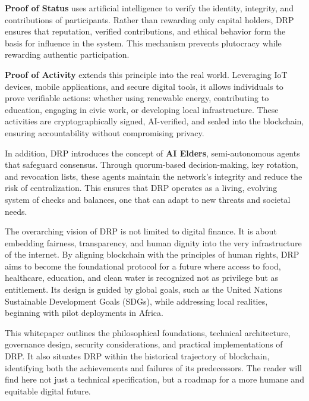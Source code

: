 \documentclass[11pt,a4paper]{article}
\begin{document}
\textbf{Proof of Status} uses artificial intelligence to verify the identity, integrity, and contributions of participants. Rather than rewarding only capital holders, DRP ensures that reputation, verified contributions, and ethical behavior form the basis for influence in the system. This mechanism prevents plutocracy while rewarding authentic participation.

\textbf{Proof of Activity} extends this principle into the real world. Leveraging IoT devices, mobile applications, and secure digital tools, it allows individuals to prove verifiable actions: whether using renewable energy, contributing to education, engaging in civic work, or developing local infrastructure. These activities are cryptographically signed, AI-verified, and sealed into the blockchain, ensuring accountability without compromising privacy.

In addition, DRP introduces the concept of \textbf{AI Elders}, semi-autonomous agents that safeguard consensus. Through quorum-based decision-making, key rotation, and revocation lists, these agents maintain the network's integrity and reduce the risk of centralization. This ensures that DRP operates as a living, evolving system of checks and balances, one that can adapt to new threats and societal needs.

The overarching vision of DRP is not limited to digital finance. It is about embedding fairness, transparency, and human dignity into the very infrastructure of the internet. By aligning blockchain with the principles of human rights, DRP aims to become the foundational protocol for a future where access to food, healthcare, education, and clean water is recognized not as privilege but as entitlement. Its design is guided by global goals, such as the United Nations Sustainable Development Goals (SDGs), while addressing local realities, beginning with pilot deployments in Africa.

This whitepaper outlines the philosophical foundations, technical architecture, governance design, security considerations, and practical implementations of DRP. It also situates DRP within the historical trajectory of blockchain, identifying both the achievements and failures of its predecessors. The reader will find here not just a technical specification, but a roadmap for a more humane and equitable digital future.

\end{document}
